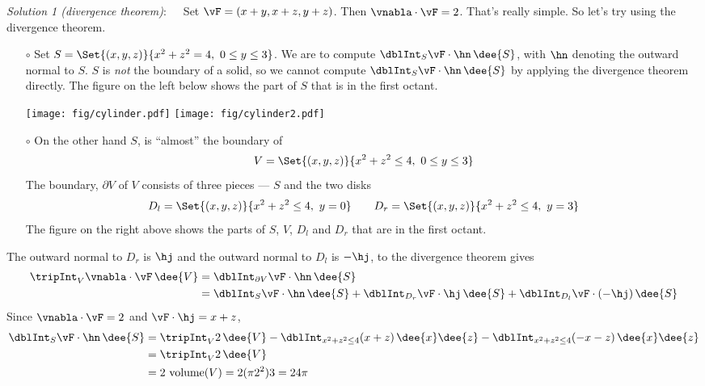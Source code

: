 \begin{solution} 
\emph{Solution 1 (divergence theorem)}:\ \ \ 
Set $\vF = (x + y, x + z, y + z)$.
Then $\vnabla\cdot\vF = 2$. That's really simple. So let's
try using the divergence theorem.

\begin{itemize}\itemsep1pt \parskip0pt  %
\item[$\circ$]
Set $S=\Set{(x,y,z)}{x^2+z^2=4,\ 0\le y\le 3}$. We are to compute
$\dblInt_S\vF\cdot\hn\,\dee{S}$, with $\hn$ denoting the outward normal to $S$.
$S$ is \emph{not} the boundary of a solid, so we cannot compute
$\dblInt_S\vF\cdot\hn\,\dee{S}$ by applying the divergence theorem directly.
The figure on the left below shows the part of $S$ that is in the first octant.

\begin{center}
       \texttt{[image: fig/cylinder.pdf]}\qquad
       \texttt{[image: fig/cylinder2.pdf]}
\end{center}


\item[$\circ$]
On the other hand $S$, is ``almost'' the boundary of 
\begin{equation*}
V = \Set{(x,y,z)}{x^2+z^2\le 4,\ 0\le y\le 3}
\end{equation*} 
The boundary, $\partial V$ of $V$ consists of three pieces --- $S$ and the
two disks
\begin{equation*}
D_l = \Set{(x,y,z)}{x^2+z^2\le 4,\ y=0}\qquad
D_r = \Set{(x,y,z)}{x^2+z^2\le 4,\ y=3}
\end{equation*}
The figure on the right above shows the parts of $S$, $V$, $D_l$ 
and $D_r$ that are  in the first octant.
\end{itemize}
The outward normal to $D_r$ is $\hj$ and the outward normal to $D_l$ is
$-\hj$, to the divergence theorem gives
\begin{align*}
\tripInt_V \vnabla\cdot \vF\,\dee{V}
&=\dblInt_{\partial V}\vF\cdot\hn\,\dee{S} \\
&=\dblInt_{S}\vF\cdot\hn\,\dee{S}
  + \dblInt_{D_r}\vF\cdot\hj\,\dee{S}
  + \dblInt_{D_l}\vF\cdot(-\hj)\,\dee{S}
\end{align*}
Since $\vnabla\cdot\vF = 2$ and $\vF\cdot\hj = x+z$, 
\begin{align*}
\dblInt_{S}\vF\cdot\hn\,\dee{S}
&= \tripInt_V 2\,\dee{V}
  -\dblInt_{x^2+z^2\le 4}(x+z)\,\dee{x}\dee{z}
  - \dblInt_{x^2+z^2\le 4}(-x-z)\,\dee{x}\dee{z} \\
&= \tripInt_V 2\,\dee{V} \\
&= 2\ \text{volume}(V)
=2(\pi 2^2) 3 =24\pi
\end{align*}


\end{solution}
